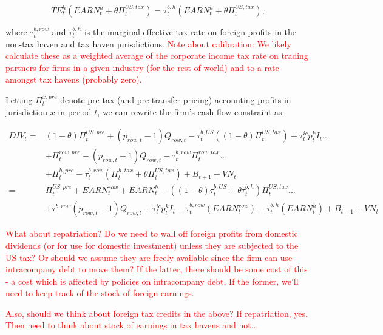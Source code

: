 \begin{equation}
\label{eqn:foreign_tax_h}
TE^{h}_{t}(EARN^{h}_{t} + \theta\Pi^{US,tax}_{t}) = \tau^{b,h}_{t}(EARN^{h}_{t}  + \theta\Pi^{US,tax}_{t}),
\end{equation}

\noindent\noindent where $\tau^{b,row}_{t}$ and $\tau^{b,h}_{t}$ is the marginal effective tax rate on foreign profits in the non-tax haven and tax haven jurisdictions.  \textcolor{red}{Note about calibration: We likely calculate these as a weighted average of the corporate income tax rate on trading partners for firms in a given industry (for the rest of world) and to a rate amongst tax havens (probably zero).}

Letting $\Pi^{x,pre}_{t}$ denote pre-tax (and pre-transfer pricing) accounting profits in jurisdiction $x$ in period $t$, we can rewrite the firm's cash flow constraint as:

\begin{equation}
\label{eqn:cash_flow_mnc2}
\begin{split}
DIV_{t} = &  (1-\theta)\Pi^{US,pre}_{t} + (p_{row,t}-1)Q_{row,t}  - \tau^{b,US}_{t}((1-\theta)\Pi^{US,tax}_{t}) + \tau^{ic}_{t}p^{k}_{t}I_{t} ... \\
& + \Pi^{row,pre}_{t}- (p_{row,t}-1)Q_{row,t} - \tau^{b,row}_{t}\Pi^{row,tax}_{t} ...\\
& + \Pi^{h,pre}_{t}- \tau^{b,row}_{t}(\Pi^{h,tax}_{t} + \theta\Pi^{US,tax}_{t}) + B_{t+1} + VN_{t} \\
     = & \Pi^{US,pre}_{t} + EARN^{row}_{t} + EARN^{h}_{t} - ((1-\theta)\tau^{b,US}_{t} + \theta\tau^{b,h}_{t})\Pi^{US,tax}_{t} ...\\
     & + \tau^{b,row}(p_{row,t}-1)Q_{row,t} + \tau^{ic}_{t}p^{k}_{t}I_{t}   - \tau^{b,row}_{t}(EARN^{row}_{t}) - \tau^{b,h}_{t}(EARN^{h}_{t})  + B_{t+1} + VN_{t}
\end{split}
\end{equation}

\textcolor{red}{What about repatriation?  Do we need to wall off foreign profits from domestic dividends (or for use for domestic investment) unless they are subjected to the US tax?  Or should we assume they are freely available since the firm can use intracompany debt to move them?  If the latter, there should be some cost of this - a cost which is affected by policies on intracompany debt.  If the former, we'll need to keep track of the stock of foreign earnings.}

\textcolor{red}{Also, should we think about foreign tax credits in the above?  If repatriation, yes.  Then need to think about stock of earnings in tax havens and not...}


